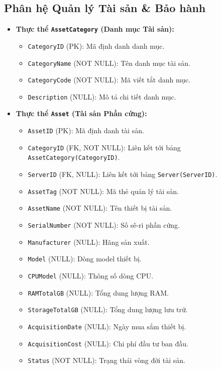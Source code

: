 \subsection{Phân hệ Quản lý Tài sản \& Bảo hành}
\begin{itemize}[leftmargin=2em]
    \item \textbf{Thực thể \texttt{AssetCategory} (Danh mục Tài sản):}
    \begin{itemize}
        \item \texttt{CategoryID} (PK): Mã định danh danh mục.
        \item \texttt{CategoryName} (NOT NULL): Tên danh mục tài sản.
        \item \texttt{CategoryCode} (NOT NULL): Mã viết tắt danh mục.
        \item \texttt{Description} (NULL): Mô tả chi tiết danh mục.
    \end{itemize}
    \item \textbf{Thực thể \texttt{Asset} (Tài sản Phần cứng):}
    \begin{itemize}
        \item \texttt{AssetID} (PK): Mã định danh tài sản.
        \item \texttt{CategoryID} (FK, NOT NULL): Liên kết tới bảng \texttt{AssetCategory(CategoryID)}.
        \item \texttt{ServerID} (FK, NULL): Liên kết tới bảng \texttt{Server(ServerID)}.
        \item \texttt{AssetTag} (NOT NULL): Mã thẻ quản lý tài sản.
        \item \texttt{AssetName} (NOT NULL): Tên thiết bị tài sản.
        \item \texttt{SerialNumber} (NOT NULL): Số sê-ri phần cứng.
        \item \texttt{Manufacturer} (NULL): Hãng sản xuất.
        \item \texttt{Model} (NULL): Dòng model thiết bị.
        \item \texttt{CPUModel} (NULL): Thông số dòng CPU.
        \item \texttt{RAMTotalGB} (NULL): Tổng dung lượng RAM.
        \item \texttt{StorageTotalGB} (NULL): Tổng dung lượng lưu trữ.
        \item \texttt{AcquisitionDate} (NULL): Ngày mua sắm thiết bị.
        \item \texttt{AcquisitionCost} (NULL): Chi phí đầu tư ban đầu.
        \item \texttt{Status} (NOT NULL): Trạng thái vòng đời tài sản.

\end{itemize}
\end{itemize}
